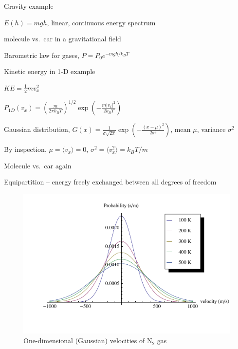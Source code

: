 \documentclass[11pt]{article}
\begin{document}
\begin{outline}
\begin{outline}
\begin{outline}
   \item{Gravity example}
      \begin{outline}
      \item $E(h)=mgh$, linear, continuous energy spectrum
      \item{molecule vs.\ car in a gravitational field}
      \item{Barometric law for gases, $P=P_0e^{-mgh/k_BT}$}
      \end{outline}
    \item {Kinetic energy in 1-D example}
      \begin{outline}
      \item $KE = \frac{1}{2}m v_x^2$
      \item $P_{1D}(v_x) = \left ( \frac{m}{2\pi k_B T} \right )^{1/2}\exp\left
          (-\frac{m|v_x|^2}{2 k_BT} \right )$
      \item Gaussian distribution,
        $G(x)=\frac{1}{\sigma\sqrt{2\pi}} \exp\left (
          -\frac{(x-\mu)^2}{2\sigma^2} \right )$, mean $\mu$, variance $\sigma^2$
      \item By inspection, $\mu=\langle v_x \rangle=0$, $\sigma^2=\langle v_x^2\rangle =k_BT/m$
      \item Molecule vs.\ car again
      \end{outline}
    \item Equipartition -- energy freely exchanged between all degrees
      of freedom
    \end{outline}
  \end{outline}

\begin{figure}
\begin{center}
\includegraphics[scale=1.25]{Images/Gaussian.pdf}
\caption{One-dimensional (Gaussian) velocities of N$_2$ gas}
\end{center}
\end{figure}


\end{outline}
\end{document}
